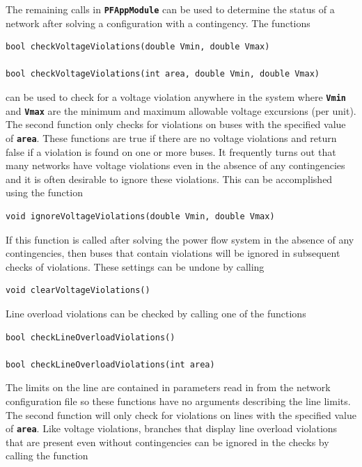 The remaining calls in \texttt{\textbf{PFAppModule}} can be used to determine the status of a network after solving a configuration with a contingency. The functions

{
\color{red}
\begin{Verbatim}[fontseries=b]
bool checkVoltageViolations(double Vmin, double Vmax)

bool checkVoltageViolations(int area, double Vmin, double Vmax)
\end{Verbatim}
}

can be used to check for a voltage violation anywhere in the system where \texttt{\textbf{Vmin}} and \texttt{\textbf{Vmax}} are the minimum and maximum allowable voltage excursions (per unit). The second function only checks for violations on buses with the specified value of \texttt{\textbf{area}}. These functions are true if there are no voltage violations and return false if a violation is found on one or more buses. It frequently turns out that many networks have voltage violations even in the absence of any contingencies and it is often desirable to ignore these violations. This can be accomplished using the function

{
\color{red}
\begin{Verbatim}[fontseries=b]
void ignoreVoltageViolations(double Vmin, double Vmax)
\end{Verbatim}
}

If this function is called after solving the power flow system in the absence of any contingencies, then buses that contain violations will be ignored in subsequent checks of violations. These settings can be undone by calling

{
\color{red}
\begin{Verbatim}[fontseries=b]
void clearVoltageViolations()
\end{Verbatim}
}

Line overload violations can be checked by calling one of the functions

{
\color{red}
\begin{Verbatim}[fontseries=b]
bool checkLineOverloadViolations()

bool checkLineOverloadViolations(int area)
\end{Verbatim}
}

The limits on the line are contained in parameters read in from the network configuration file so these functions have no arguments describing the line limits. The second function will only check for violations on lines with the specified value of \texttt{\textbf{area}}. Like voltage violations, branches that display line overload violations that are present even without contingencies can be ignored in the checks by calling the function

